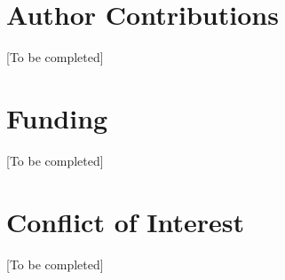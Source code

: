 \documentclass{article}
\begin{document}
\section*{Author Contributions}\label{author-contributions}

{[}To be completed{]}

\section*{Funding}\label{funding}

{[}To be completed{]}

\section*{Conflict of Interest}\label{conflict-of-interest}

{[}To be completed{]}
\end{document}
